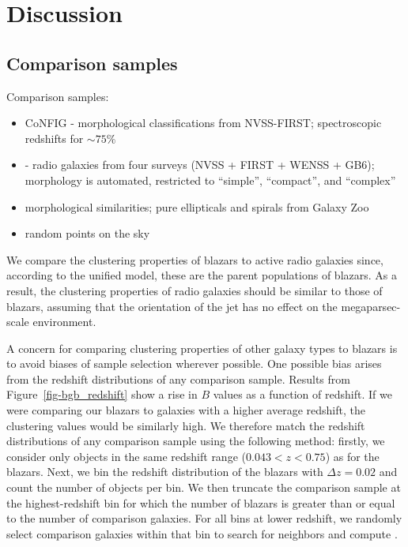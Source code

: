 \documentclass{emulateapj}
\begin{document}

\section{Discussion}\label{sec-survey_discussion}

\subsection{Comparison samples}\label{ssec-comparison}

Comparison samples:

\begin{itemize}
    \item CoNFIG \citep{gen08} - morphological classifications from NVSS-FIRST; spectroscopic redshifts for $\sim75\%$
    \item \citet{kim08} - radio galaxies from four surveys (NVSS + FIRST + WENSS + GB6); morphology is automated, restricted to ``simple'', ``compact'', and ``complex''
    \item morphological similarities; pure ellipticals and spirals from Galaxy Zoo
    \item random points on the sky 
\end{itemize}

We compare the clustering properties of blazars to active radio galaxies since, according to the unified model, these are the parent populations of blazars. As a result, the clustering properties of radio galaxies should be similar to those of blazars, assuming that the orientation of the jet has no effect on the megaparsec-scale environment. 

A concern for comparing clustering properties of other galaxy types to blazars is to avoid biases of sample selection wherever possible. One possible bias arises from the redshift distributions of any comparison sample. Results from Figure~\ref{fig-bgb_redshift} show a rise in $B$ values as a function of redshift. If we were comparing our blazars to galaxies with a higher average redshift, the clustering values would be similarly high. We therefore match the redshift distributions of any comparison sample using the following method: firstly, we consider only objects in the same redshift range ($0.043<z<0.75$) as for the blazars. Next, we bin the redshift distribution of the blazars with $\Delta z=0.02$ and count the number of objects per bin. We then truncate the comparison sample at the highest-redshift bin for which the number of blazars is greater than or equal to the number of comparison galaxies. For all bins at lower redshift, we randomly select comparison galaxies within that bin to search for neighbors and compute \bgb. 
\end{document}
